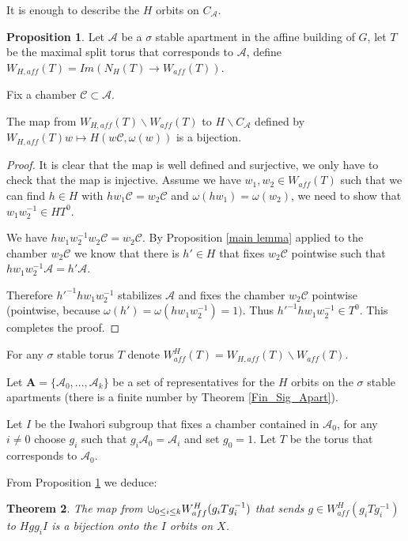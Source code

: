 \documentclass[12pt]{article}
\newcommand{\A}{\mathcal{A}}
\newcommand{\C}{\mathcal{C}}
\newcommand{\<}{\langle}
\renewcommand{\>}{\rangle}
\theoremstyle{plain}
\newtheorem{theorem}{Theorem}[section] %
\theoremstyle{definition}
\newtheorem{prop}[theorem]{Proposition}
\begin{document}
It is enough to describe the $H$ orbits on $C_\A$. 

\begin{prop}\label{3.2}
Let $\A$ be a $\sigma$ stable apartment in the affine building of $G$, let $T$ be the maximal split torus that corresponds to $\A$, define $W_{H,aff}(T)=Im(N_H(T)\rightarrow W_{aff}(T))$. 

 Fix a chamber $\C\subset \A$.

 The map from $W_{H,aff}(T)\backslash W_{aff}(T)$ to $H\backslash C_\A$ defined by $W_{H,aff}(T)w\mapsto H(w\C,\omega(w))$ is a bijection.

\end{prop}

\begin{proof}
It is clear that the map is well defined and surjective, we only have to check that the map is injective. Assume we have $w_1,w_2\in W_{aff}(T)$ such that we can find $h\in H$ with $hw_1\C=w_2\C$ and $\omega(hw_1)=\omega(w_2)$, we need to show that $w_1w_2^{-1}\in HT^0$.

 We have $hw_1w_2^{-1}w_2\C=w_2\C$. By Proposition \ref{main lemma} applied to the chamber $w_2\C$ we know that there is $h'\in H$ that fixes $w_2\C$ pointwise such that $hw_1w_2^{-1}\A=h'\A$. 

Therefore $h'^{-1}hw_1w_2^{-1}$ stabilizes $\A$ and fixes the chamber $w_2\C$ pointwise (pointwise, because $\omega(h')=\omega(hw_1w_2^{-1})=1)$. Thus $h'^{-1}hw_1w_2^{-1}\in T^0$. This completes the proof.
\end{proof}

For any $\sigma$ stable torus $T$ denote $W^H_{aff}(T)=W_{H,aff}(T)\backslash W_{aff}(T)$.

Let $\mathbf{A}=\{\A_0,...,\A_k\}$ be a set of representatives for the $H$ orbits on the $\sigma$ stable apartments (there is a finite number by Theorem \ref{Fin_Sig_Apart}).


Let $I$ be the Iwahori subgroup that fixes a chamber contained in $\A_0$, for any $i\neq0$ choose $g_i$ such that $g_i\A_0=\A_i$ and set $g_0=1$. Let $T$ be the torus that corresponds to $\A_0$.

From Proposition \ref{3.2} we deduce:

\begin{theorem}\label{3.3}
 The map from $\mathbin{\mathaccent\cdot\cup}_{0\leq i\leq k} W^H_{aff}(g_iTg_i^{-1})$ that sends $g\in W^H_{aff}(g_iTg_i^{-1})$ to $Hgg_iI$ is a bijection onto the $I$ orbits on $X$.
\end{theorem}
\end{document}
